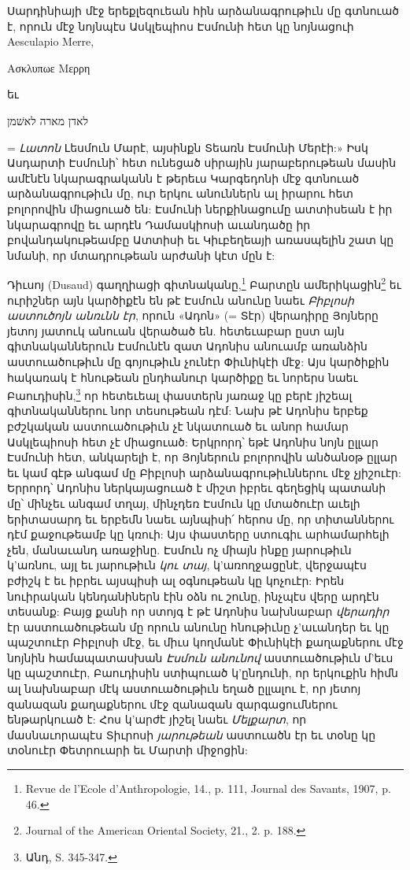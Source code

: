\documentclass{article}
\begin{document}
{Սարդինիայի մէջ երեքլեզուեան հին արձանագրութիւն մը գտնուած է, որուն մէջ նոյնպէս Ասկլեպիոս Էսմունի հետ կը նոյնացուի Aesculapio Merre, \begin{greek}Ασκλυπωε Μερρη\end{greek} եւ \begin{hebrewfont}לאדן מארה לאשׁמן\end{hebrewfont} = \emph{Լատոն} Լեսմուն Մարէ, այսինքն Տեառն Էսմունի Մերէի:» Իսկ Ասդարտի Էսմունի՝ հետ ունեցած սիրային յարաբերութեան մասին ամէնէն նկարագրականն է թերեւս Կարգեդոնի մէջ գտնուած արձանագրութիւն մը, ուր երկու անուններն ալ իրարու հետ բոլորովին միացուած են: Էսմունի ներքինացումը ատտիսեան է իր նկարագրովը եւ արդէն Դամասկիոսի աւանդածը իր բովանդակութեամբը Ատտիսի եւ Կիւբեղեայի առասպելին շատ կը նմանի, որ մտադրութեան արժանի կէտ մըն է:

Դիւսոյ (Dusaud) գաղղիացի գիտնականը,\footnote{Revue de l'Ecole d'Anthropologie, 14., p. 111, Journal des Savants, 1907, p. 46.} Բարտըն ամերիկացին\footnote{Journal of the American Oriental Society, 21., 2. p. 188.} եւ ուրիշներ այն կարծիքէն են թէ Էսմուն անունը նաեւ \emph{Բիբլոսի աստուծոյն անռւնն էր}, որուն «Ադոն» (= Տէր) վերադիրը Յոյները յետոյ յատուկ անուան վերածած են. հետեւաբար ըստ այն գիտնականներուն Էսմունէն զատ Ադոնիս անուամբ առանձին աստուածութիւն մը գոյութիւն չունէր Փիւնիկէի մէջ: Այս կարծիքին հակառակ է հնութեան ընդհանուր կարծիքը եւ նորերս նաեւ Բաուդիսին,\footnote{Անդ, S. 345-347.} որ հետեւեալ փաստերն յառաջ կը բերէ յիշեալ գիտնականներու նոր տեսութեան դէմ: Նախ թէ Ադոնիս երբեք բժշկական աստուածութիւն չէ նկատուած եւ անոր համար Ասկլեպիոսի հետ չէ միացուած: Երկրորդ՝ եթէ Ադոնիս նոյն ըլլար Էսմունի հետ, անկարելի է, որ Յոյներուն բոլորովին անծանօթ ըլլար եւ կամ գէթ անգամ մը Բիբլոսի արձանագրութիւններու մէջ չյիշուէր: Երրորդ՝ Ադոնիս ներկայացուած է միշտ իբրեւ գեղեցիկ պատանի մը՝ մինչեւ անգամ տղայ, մինչդեռ Էսմուն կը մտածուէր աւելի երիտասարդ եւ երբեմն նաեւ այնպիսի՛ հերոս մը, որ տիտաններու դէմ քաջութեամբ կը կռուի: Այս փաստերը ստուգիւ արհամարհելի չեն, մանաւանդ առաջինը. Էսմուն ոչ միայն ինքը յարութիւն կ'առնու, այլ եւ յարութիւն \emph{կու տայ}, կ'առողջացընէ, վերջապէս բժիշկ է եւ իբրեւ այսպիսի ալ օգնութեան կը կոչուէր: Իրեն նուիրական կենդանիներն էին օձն ու շունը, ինչպէս վերը արդէն տեսանք: Բայց քանի որ ստոյգ է թէ Ադոնիս նախնաբար \emph{վերադիր} էր աստուածութեան մը որուն անունը հնութիւնը չ'աւանդեր եւ կը պաշտուէր Բիբլոսի մէջ, եւ միւս կողմանէ Փիւնիկէի քաղաքներու մէջ նոյնին համապատասխան \emph{Էսմուն անունով} աստուածութիւն մ'եւս կը պաշտուէր, Բաուդիսին ստիպուած կ'ընդունի, որ երկուքին հիմն ալ նախնաբար մէկ աստուածութիւն եղած ըլլալու է, որ յետոյ զանազան քաղաքներու մէջ զանազան զարգացումներու ենթարկուած է: Հոս կ'արժէ յիշել նաեւ \emph{Մելքարտ}, որ մասնաւորապէս Տիւրոսի \emph{յարութեան} աստուածն էր եւ տօնը կը տօնուէր Փետրուարի եւ Մարտի միջոցին:

}
\end{document}
